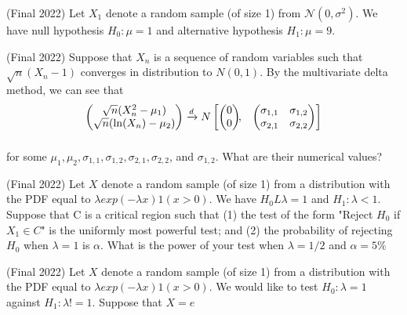 \documentclass[answers]{exam}
\begin{document}
\begin{questions}
\question (Final 2022) Let $X_1$ denote a random sample (of size 1) from $\mathcal{N}(0, \sigma^2)$. We have null hypothesis $H_0: \mu = 1$ and alternative hypothesis $H_1: \mu = 9$.
\begin{solution} 
\end{solution}

\question (Final 2022) Suppose that $X_n$ is a sequence of random variables such that $\sqrt{n}(X_n-1)$ converges in distribution to $N(0,1)$. By the multivariate delta method, we can see that
\begin{align*}
    \begin{pmatrix}
    \sqrt{n}(X_n^2-\mu_1)\\
    \sqrt{n}(\ln(X_n) - \mu_2)\\
    \end{pmatrix} 
    &\xrightarrow{d}  N
    \begin{bmatrix}
    \begin{pmatrix}
    0\\
    0
    \end{pmatrix}\!\!,&
    \begin{pmatrix}
    \sigma_{1,1} & \sigma_{1,2}\\
    \sigma_{2,1} & \sigma_{2,2}
    \end{pmatrix}
    \end{bmatrix}\\[2\jot]
    \end{align*}

for some $\mu_1, \mu_2, \sigma_{1,1}, \sigma_{1,2}, \sigma_{2,1}, \sigma_{2,2}$, and $\sigma_{1,2}$. What are their numerical values?
\begin{solution}
\end{solution}

\question (Final 2022) Let $X$ denote a random sample (of size 1) from a distribution with the PDF equal to $\lambda exp(-\lambda x) 1(x>0)$. We have $H_0 L \lambda = 1$ and $H_1 : \lambda < 1$. Suppose that C is a critical region such that (1) the test of the form "Reject $H_0$ if $X_1 \in C$" is the uniformly most powerful test; and (2) the probability of rejecting $H_0$ when $\lambda = 1$ is $\alpha$. What is the power of your test when $\lambda = 1/2$ and $\alpha = 5\%$
\begin{solution}
\end{solution}

\question (Final 2022) Let $X$ denote a random sample (of size 1) from a distribution with the PDF equal to $\lambda exp (-\lambda x)1(x>0)$. We would like to test $H_0 : \lambda = 1$ against $H_1 : \lambda != 1$. Suppose that $X=e$
\begin{parts}

\end{parts}
\end{questions}
\end{document}
